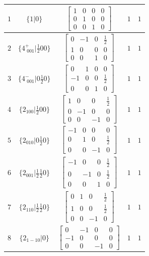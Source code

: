 \documentclass[fleqn,8pt]{jsarticle}
\begin{document}
\begin{longtable}{ccccc}
$ 1 $ & $ \{1|0\} $ & $ \begin{bmatrix} 1 & 0 & 0 & 0 \\ 0 & 1 & 0 & 0 \\ 0 & 0 & 1 & 0 \end{bmatrix} $ & $ 1 $ & $ 1 $ \\ \hline
$ 2 $ & $ \{4^{+}_{\,\,001}|\frac{1}{2} 0 0\} $ & $ \begin{bmatrix} 0 & -1 & 0 & \frac{1}{2} \\ 1 & 0 & 0 & 0 \\ 0 & 0 & 1 & 0 \end{bmatrix} $ & $ 1 $ & $ 1 $ \\ \hline
$ 3 $ & $ \{4^{-}_{\,\,001}|0 \frac{1}{2} 0\} $ & $ \begin{bmatrix} 0 & 1 & 0 & 0 \\ -1 & 0 & 0 & \frac{1}{2} \\ 0 & 0 & 1 & 0 \end{bmatrix} $ & $ 1 $ & $ 1 $ \\ \hline
$ 4 $ & $ \{2{}_{100}|\frac{1}{2} 0 0\} $ & $ \begin{bmatrix} 1 & 0 & 0 & \frac{1}{2} \\ 0 & -1 & 0 & 0 \\ 0 & 0 & -1 & 0 \end{bmatrix} $ & $ 1 $ & $ 1 $ \\ \hline
$ 5 $ & $ \{2{}_{010}|0 \frac{1}{2} 0\} $ & $ \begin{bmatrix} -1 & 0 & 0 & 0 \\ 0 & 1 & 0 & \frac{1}{2} \\ 0 & 0 & -1 & 0 \end{bmatrix} $ & $ 1 $ & $ 1 $ \\ \hline
$ 6 $ & $ \{2{}_{001}|\frac{1}{2} \frac{1}{2} 0\} $ & $ \begin{bmatrix} -1 & 0 & 0 & \frac{1}{2} \\ 0 & -1 & 0 & \frac{1}{2} \\ 0 & 0 & 1 & 0 \end{bmatrix} $ & $ 1 $ & $ 1 $ \\ \hline
$ 7 $ & $ \{2{}_{110}|\frac{1}{2} \frac{1}{2} 0\} $ & $ \begin{bmatrix} 0 & 1 & 0 & \frac{1}{2} \\ 1 & 0 & 0 & \frac{1}{2} \\ 0 & 0 & -1 & 0 \end{bmatrix} $ & $ 1 $ & $ 1 $ \\ \hline
$ 8 $ & $ \{2{}_{1-10}|0\} $ & $ \begin{bmatrix} 0 & -1 & 0 & 0 \\ -1 & 0 & 0 & 0 \\ 0 & 0 & -1 & 0 \end{bmatrix} $ & $ 1 $ & $ 1 $ \\ \hline

\end{longtable}
\end{document}

